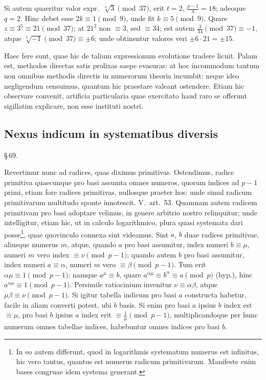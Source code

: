 \documentclass[12pt,a4paper]{article}
\theoremstyle{plain}
\theoremstyle{definition}
\theoremstyle{remark}
\begin{document}
Si autem quaeritur valor expr.\ $\sqrt[3]{3} \pmod{37}$, erit $t = 2$, $\frac{p-1}{\delta} = 18$; adeoque $q = 2$. Hinc debet esse $2k \equiv 1 \pmod{9}$, unde fit $k \equiv 5 \pmod{9}$. Quare $z \equiv 3^5 \equiv 21 \pmod{37}$; at $21^3$ non $\equiv 3$, sed $\equiv 34$; est autem $\frac{3}{34} \pmod{37} \equiv -1$, atque $\sqrt[3]{-1} \pmod{37} \equiv \pm 6$; unde obtinentur valores veri $\pm 6 \cdot 21 = \pm 15$.

Haec fere sunt, quae hic de talium expressionum evolutione tradere licuit. Palam est, methodos directas satis prolixas saepe evasuras: at hoc incommodum tantum non omnibus methodis directis in numerorum theoria incumbit: neque ideo negligendum censuimus, quantum hic praestare valeant ostendere. Etiam hic observare convenit, artificia particularia quae exercitato haud raro se offerunt sigillatim explicare, non esse instituti nostri.

\subsection*{Nexus indicum in systematibus diversis}

\begin{center}\S\,69.\end{center}

Revertimur nunc ad radices, quas diximus primitivas. Ostendimus, radice primitiva quaecunque pro basi assumta omnes numeros, quorum indices ad $p-1$ primi, etiam fore radices primitivas, nullosque praeter hos: unde simul radicum primitivarum multitudo sponte innotescit. V.\ art.~53. Quamnam autem radicem primitivam pro basi adoptare velimus, in genere arbitrio nostro relinquitur; unde intelligitur, etiam hic, ut in calculo logarithmico, plura quasi systemata dari posse\footnote{In eo autem differunt, quod in logarithmis systematum numerus est infinitus, hic vero tantus, quantus est numerus radicum primitivarum. Manifeste enim bases congruae idem systema generant.}, quae quovinculo connexa sint videamus. Sint $a$, $b$ duae radices primitivae, aliusque numerus $m$, atque, quando $a$ pro basi assumitur, index numeri $b \equiv \mu$, numeri $m$ vero index $\equiv \nu \pmod{p-1}$; quando autem $b$ pro basi assumitur, index numeri $a \equiv \alpha$, numeri $m$ vero $\equiv \beta \pmod{p-1}$. Tum erit $\alpha\mu \equiv 1 \pmod{p-1}$; namque $a^\mu \equiv b$, quare $a^{\alpha\mu} \equiv b^\alpha \equiv a \pmod{p}$ (hyp.), hinc $a^{\alpha\mu} \equiv 1 \pmod{p-1}$. Persimile ratiocinium invenitur $\nu \equiv \alpha\beta$, atque $\mu\beta \equiv \nu \pmod{p-1}$. Si igitur tabella indicum pro basi $a$ constructa habetur, facile in aliam converti potest, ubi $b$ basis. Si enim pro basi $a$ ipsius $b$ index est $\equiv \mu$, pro basi $b$ ipsius $a$ index erit $\equiv \frac{1}{\mu} \pmod{p-1}$, multiplicandoque per hunc numerum omnes tabellae indices, habebuntur omnes indices pro basi $b$.
\end{document}
